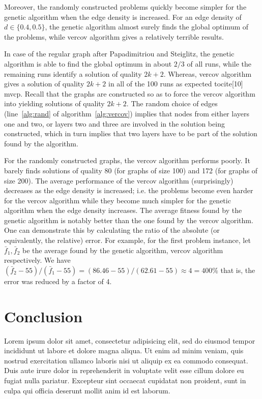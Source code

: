 \documentclass[12pt]{article}
\begin{document}
Moreover, the randomly constructed problems quickly
become simpler for the genetic algorithm when the edge
density is increased.
For an edge density of $d \in \{0.4, 0.5\}$, the
genetic algorithm almost surely finds the global optimum
of the problems, while vercov algorithm gives
a relatively terrible results.

In case of the regular graph after Papadimitriou and
Steiglitz, the genetic algorithm is able to find the global
optimum in about $2/3$ of all runs, while the remaining
runs identify a solution of quality $2k + 2$.
Whereas, vercov algorithm gives a solution of
quality $2k + 2$ in all of the 100 runs as expected tocite{[10] mvcp}.
Recall that the graphs are constructed
so as to force the vercov algorithm into yielding solutions
of quality $2k + 2$.
The random choice of edges (line~\ref{alg:rand} of algorithm~\ref{alg:vercov})
implies that nodes from either layers one and two, or layers two and three
are involved in the solution being constructed,
which in turn implies that two layers have to be part of the solution
found by the algorithm.

For the randomly constructed graphs, the vercov algorithm
performs poorly.
It barely finds solutions of quality 80 (for graphs of size 100)
and 172 (for graphs of size 200).
The average performance of the vercov algorithm (surprisingly)
decreases as the edge density is increased;
i.e. the problems become even harder for the vercov algorithm
while they become much simpler for the genetic algorithm when
the edge density increases.
The average fitness found by the genetic algorithm is notably
better than the one found by the vercov algorithm.
One can demonstrate this by calculating
the ratio of the absolute (or equivalently, the relative) error.
For example, for the first problem instance,
let $\bar{f}_1, \bar{f}_2$ be the average found by
the genetic algorithm, vercov algorithm respectively.
We have $ (\bar{f}_2 - 55) / (\bar{f}_1 - 55) = (86.46 - 55)/(62.61 - 55) \approx 4 = 400\%$
that is, the error was reduced by a factor of 4.


\section{Conclusion}
Lorem ipsum dolor sit amet, consectetur adipisicing elit, sed do eiusmod
tempor incididunt ut labore et dolore magna aliqua. Ut enim ad minim veniam,
quis nostrud exercitation ullamco laboris nisi ut aliquip ex ea commodo
consequat. Duis aute irure dolor in reprehenderit in voluptate velit esse
cillum dolore eu fugiat nulla pariatur. Excepteur sint occaecat cupidatat non
proident, sunt in culpa qui officia deserunt mollit anim id est laborum.


\pagebreak


\cleardoublepage{}
%
%
\printbibliography

\end{document}
